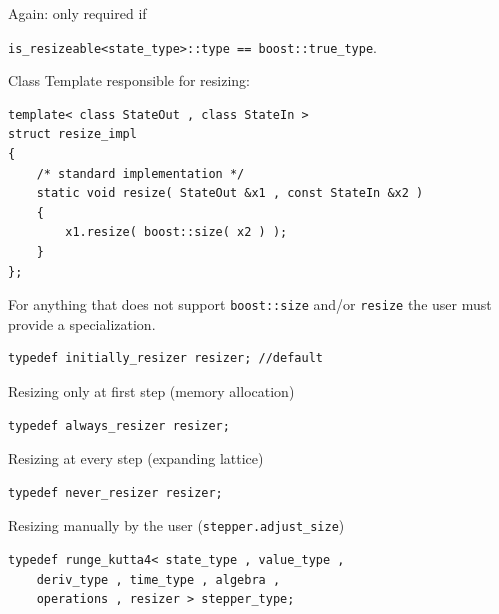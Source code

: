\begin{frame}[fragile]
Again: only required if \\
\centerline{\lstinline+is_resizeable<state_type>::type == boost::true_type+.}
\vspace{0.5em}

Class Template responsible for resizing:
\begin{lstlisting}
template< class StateOut , class StateIn >
struct resize_impl
{
    /* standard implementation */
    static void resize( StateOut &x1 , const StateIn &x2 )
    {
        x1.resize( boost::size( x2 ) );
    }
};
\end{lstlisting}

For anything that does not support \lstinline+boost::size+ and/or \lstinline+resize+ the user must provide a specialization.

\end{frame}


\begin{frame}[fragile]
\vspace{2ex}

\begin{lstlisting}
typedef initially_resizer resizer; //default
\end{lstlisting}
Resizing only at first step (memory allocation)

\vspace{1ex}
\begin{lstlisting}
typedef always_resizer resizer;
\end{lstlisting}
Resizing at every step (expanding lattice)

\vspace{1ex}
\begin{lstlisting}
typedef never_resizer resizer;
\end{lstlisting}
Resizing manually by the user (\lstinline+stepper.adjust_size+)

\vspace{2ex}
\begin{lstlisting}
typedef runge_kutta4< state_type , value_type , 
    deriv_type , time_type , algebra , 
    operations , resizer > stepper_type; 
\end{lstlisting}


\end{frame}



